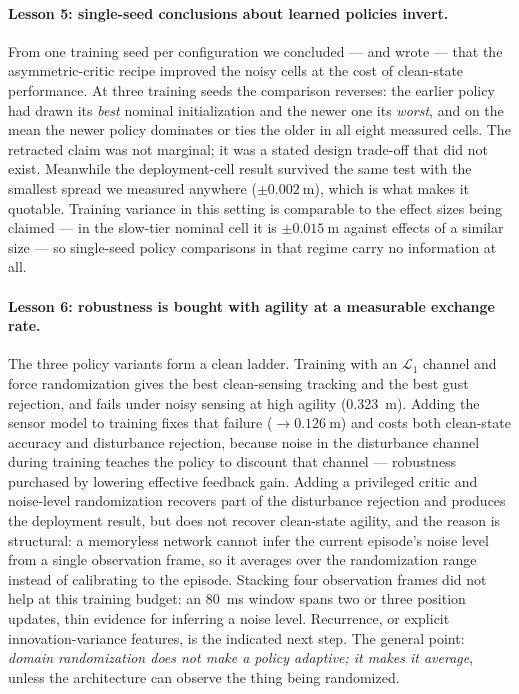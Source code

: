 \paragraph{Lesson 5: single-seed conclusions about learned policies invert.}
From one training seed per configuration we concluded --- and wrote --- that the
asymmetric-critic recipe improved the noisy cells at the cost of clean-state
performance. At three training seeds the comparison reverses: the earlier policy had
drawn its \emph{best} nominal initialization and the newer one its \emph{worst}, and on
the mean the newer policy dominates or ties the older in all eight measured cells. The
retracted claim was not marginal; it was a stated design trade-off that did not exist.
Meanwhile the deployment-cell result survived the same test with the smallest spread we
measured anywhere ($\pm\SI{0.002}{\meter}$), which is what makes it quotable. Training
variance in this setting is comparable to the effect sizes being claimed --- in the
slow-tier nominal cell it is $\pm\SI{0.015}{\meter}$ against effects of a similar size
--- so single-seed policy comparisons in that regime carry no information at all.

\paragraph{Lesson 6: robustness is bought with agility at a measurable exchange rate.}
The three policy variants form a clean ladder. Training with an $\mathcal{L}_1$ channel
and force randomization gives the best clean-sensing tracking and the best gust
rejection, and fails under noisy sensing at high agility (\SI{0.323}{\meter}). Adding
the sensor model to training fixes that failure ($\rightarrow\SI{0.126}{\meter}$) and
costs both clean-state accuracy and disturbance rejection, because noise in the
disturbance channel during training teaches the policy to discount that channel ---
robustness purchased by lowering effective feedback gain. Adding a privileged critic and
noise-level randomization recovers part of the disturbance rejection and produces the
deployment result, but does not recover clean-state agility, and the reason is
structural: a memoryless network cannot infer the current episode's noise level from a
single observation frame, so it averages over the randomization range instead of
calibrating to the episode. Stacking four observation frames did not help at this
training budget: an \SI{80}{\milli\second} window spans two or three position updates,
thin evidence for inferring a noise level. Recurrence, or explicit innovation-variance
features, is the indicated next step. The general point:
\emph{domain randomization does not make a policy adaptive; it makes it average}, unless
the architecture can observe the thing being randomized.

